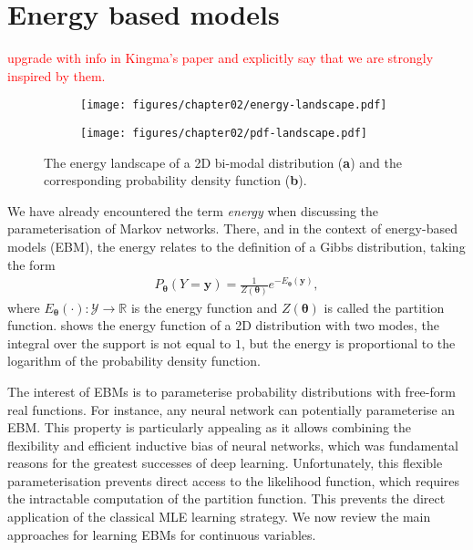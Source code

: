 \section{Energy based models} \textcolor{red}{upgrade with info in Kingma's paper and explicitly say that we are strongly inspired by them.}
\begin{figure*}
  \centering
  \begin{subfigure}{.48\textwidth}
    \centering
    \texttt{[image: figures/chapter02/energy-landscape.pdf]}
    \caption{}
    \label{fig:Energy}
  \end{subfigure}
  \begin{subfigure}{.48\textwidth}
    \centering
    \texttt{[image: figures/chapter02/pdf-landscape.pdf]}
    \caption{}
    \label{fig:pdf}
  \end{subfigure}
  \caption{The energy landscape of a 2D bi-modal distribution (\textbf{a}) and the corresponding probability density function (\textbf{b}).}
\end{figure*}
We have already encountered the term \textit{energy} when discussing the parameterisation of Markov networks. There, and in the context of energy-based models (EBM), the energy relates to the definition of a Gibbs distribution, taking the form
\begin{align}
  P_{\bm{\theta}}(Y=\bm{y}) = \frac{1}{Z(\bm{\theta})} e^{-E_{\bm{\theta}}(\bm{y})},
\end{align}
where $E_{\bm{\theta}}(\cdot): \mathcal{Y}\rightarrow \mathbb{R}$ is the energy function and $Z(\bm{\theta})$ is called the partition function.  shows the energy function of a 2D distribution with two modes, the integral over the support is not equal to $1$, but the energy is proportional to the logarithm of the probability density function.

The interest of EBMs is to parameterise probability distributions with free-form real functions. For instance, any neural network can potentially parameterise an EBM. This property is particularly appealing as it allows combining the flexibility and efficient inductive bias of neural networks, which was fundamental reasons for the greatest successes of deep learning. Unfortunately, this flexible parameterisation prevents direct access to the likelihood function, which requires the intractable computation of the partition function. This prevents the direct application of the classical MLE learning strategy. We now review the main approaches for learning EBMs for continuous variables.

